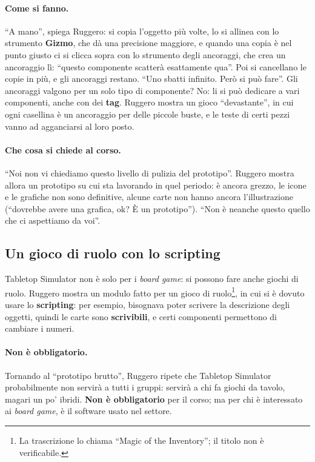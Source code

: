 \paragraph{Come si fanno.} ``A mano'', spiega Ruggero: si copia l'oggetto più volte, lo
si allinea con lo strumento \textbf{Gizmo}, che dà una precisione maggiore, e quando
una copia è nel punto giusto ci si clicca sopra con lo strumento degli ancoraggi, che
crea un ancoraggio lì: ``questo componente scatterà esattamente qua''. Poi si cancellano
le copie in più, e gli ancoraggi restano. ``Uno sbatti infinito. Però si può fare''.
Gli ancoraggi valgono per un solo tipo di componente? No: li si può dedicare a vari
componenti, anche con dei \textbf{tag}. Ruggero mostra un gioco ``devastante'', in cui
ogni casellina è un ancoraggio per delle piccole buste, e le teste di certi pezzi vanno
ad agganciarsi al loro posto.

\paragraph{Che cosa si chiede al corso.} ``Noi non vi chiediamo questo livello di
pulizia del prototipo''. Ruggero mostra allora un prototipo su cui sta lavorando in
quel periodo: è ancora grezzo, le icone e le grafiche non sono definitive, alcune carte
non hanno ancora l'illustrazione (``dovrebbe avere una grafica, ok? È un prototipo'').
``Non è neanche questo quello che ci aspettiamo da voi''.

\subsection{Un gioco di ruolo con lo scripting}
\label{a8:sec:mod-gdr}

Tabletop Simulator non è solo per i \emph{board game}: si possono fare anche giochi di
ruolo. Ruggero mostra un modulo fatto per un gioco di ruolo\footnote{La trascrizione
lo chiama ``Magic of the Inventory''; il titolo non è verificabile.}, in cui si è dovuto
usare lo \textbf{scripting}: per esempio, bisognava poter scrivere la descrizione degli
oggetti, quindi le carte sono \textbf{scrivibili}, e certi componenti permettono di
cambiare i numeri.

\paragraph{Non è obbligatorio.} Tornando al ``prototipo brutto'', Ruggero ripete che
Tabletop Simulator probabilmente non servirà a tutti i gruppi: servirà a chi fa giochi
da tavolo, magari un po' ibridi. \textbf{Non è obbligatorio} per il corso; ma per chi è
interessato ai \emph{board game}, è il software usato nel settore.


